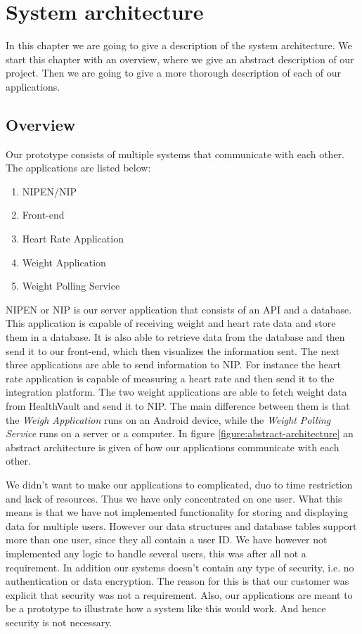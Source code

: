 \chapter{System architecture}
\label{ch:architecture}


In this chapter we are going to give a description of the system architecture.
We start this chapter with an overview, where we give an abstract description of our project.
Then we are going to give a more thorough description of each of our applications.

\section{Overview}

Our prototype consists of multiple systems that communicate with each other.
The applications are listed below:

\begin{enumerate}
	\item NIPEN/NIP
	\item Front-end
	\item Heart Rate Application
	\item Weight Application
	\item Weight Polling Service
\end{enumerate}

NIPEN or NIP is our server application that consists of an API and a database.
This application is capable of receiving weight and heart rate data and store them in a database.
It is also able to retrieve data from the database and then send it to our front-end, which then visualizes the information sent.
The next three applications are able to send information to NIP.
For instance the heart rate application is capable of measuring a heart rate and then send it to the integration platform.
The two weight applications are able to fetch weight data from HealthVault and send it to NIP.
The main difference between them is that the \textit{Weigh Application} runs on an Android device, while the \textit{Weight Polling Service} runs on a server or a computer.
In figure \ref{figure:abstract-architecture} an abstract architecture is given of how our applications communicate with each other.

We didn't want to make our applications to complicated, duo to time restriction and lack of resources.
Thus we have only concentrated on one user.
What this means is that we have not implemented functionality for storing and displaying data for multiple users.
However our data structures and database tables support more than one user, since they all contain a user ID.
We have however not implemented any logic to handle several users, this was after all not a requirement.
In addition our systems doesn't contain any type of security, i.e. no authentication or data encryption.
The reason for this is that our customer was explicit that security was not a requirement.
Also, our applications are meant to be a prototype to illustrate how a system like this would work.
And hence security is not necessary.

